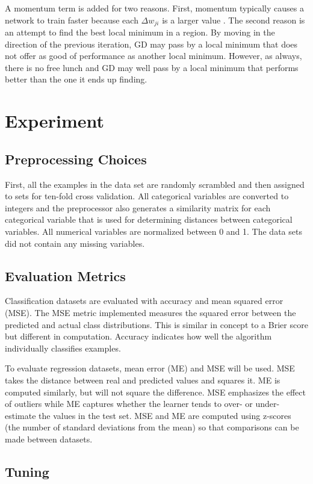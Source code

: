 \documentclass[twoside,10pt]{article}
\begin{document}
A momentum term is added for two reasons. First, momentum typically causes a network to train faster because each $\Delta w_{ji}$ is a larger value \citep{rumelhart1988learning}.
The second reason is an attempt to find the best local minimum in a region.
By moving in the direction of the previous iteration, GD may pass by a local minimum that does not offer as good of performance as another local minimum.
However, as always, there is no free lunch and GD may well pass by a local minimum that performs better than the one it ends up finding.

\section{Experiment}

\subsection{Preprocessing Choices}
First, all the examples in the data set are randomly scrambled and then assigned to sets
for ten-fold cross validation. All categorical variables are converted to integers and the
preprocessor also generates a similarity matrix for each categorical variable that is used for
determining distances between categorical variables. All numerical variables are normalized
between 0 and 1. The data sets did not contain any missing variables.

\subsection{Evaluation Metrics}
Classification datasets are evaluated with accuracy and mean squared error (MSE). The MSE metric implemented measures the squared error between the predicted and actual class distributions. This is similar in concept to a Brier score but different in computation.  Accuracy indicates how well the algorithm individually classifies examples.

To evaluate regression datasets, mean error (ME) and MSE will be used. MSE takes the distance between real and predicted values and squares it. ME is computed similarly, but will not square the difference. MSE emphasizes the effect of outliers while ME captures whether the learner tends to over- or under-estimate the values in the test set. MSE and ME are computed using z-scores (the number of standard deviations from the mean) so that comparisons can be made between datasets.

\subsection{Tuning}
\end{document}
